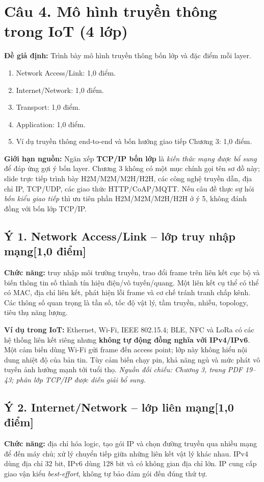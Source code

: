 \documentclass[12pt,a4paper]{article}
\newcommand{\muc}[1]{\subsection*{#1\hfill{\color{teal}\normalsize [1,0 điểm]}}}
\newcommand{\nguon}[1]{{\small\itshape\color{navy}Nguồn đối chiếu: #1.}}
\begin{document}
\section{Câu 4. Mô hình truyền thông trong IoT (4 lớp)}
\textbf{Đề giả định:} Trình bày mô hình truyền thông bốn lớp và đặc điểm mỗi layer.
\begin{barem}
\begin{enumerate}
\item Network Access/Link: 1,0 điểm.
\item Internet/Network: 1,0 điểm.
\item Transport: 1,0 điểm.
\item Application: 1,0 điểm.
\item Ví dụ truyền thông end-to-end và bốn hướng giao tiếp Chương 3: 1,0 điểm.
\end{enumerate}
\end{barem}
\begin{luuy}
\textbf{Giới hạn nguồn:} Ngăn xếp \textbf{TCP/IP bốn lớp} là \emph{kiến thức mạng được bổ sung} để đáp ứng gợi ý bốn layer. Chương 3 không có một mục chính gọi tên sơ đồ này; slide trực tiếp trình bày H2M/M2M/M2H/H2H, các công nghệ truyền dẫn, địa chỉ IP, TCP/UDP, các giao thức HTTP/CoAP/MQTT. Nếu câu đề thực sự hỏi \emph{bốn kiểu giao tiếp} thì ưu tiên phần H2M/M2M/M2H/H2H ở ý 5, không đánh đồng với bốn lớp TCP/IP.
\end{luuy}

\muc{Ý 1. Network Access/Link -- lớp truy nhập mạng}
\textbf{Chức năng:} truy nhập môi trường truyền, trao đổi frame trên liên kết cục bộ và biến thông tin số thành tín hiệu điện/vô tuyến/quang. Một liên kết cụ thể có thể có MAC, địa chỉ liên kết, phát hiện lỗi frame và cơ chế tránh tranh chấp kênh. Các thông số quan trọng là tần số, tốc độ vật lý, tầm truyền, nhiễu, topology, tiêu thụ năng lượng.

\textbf{Ví dụ trong IoT:} Ethernet, Wi-Fi, IEEE 802.15.4; BLE, NFC và LoRa có các hệ thống liên kết riêng nhưng \textbf{không tự động đồng nghĩa với IPv4/IPv6}. Một cảm biến dùng Wi-Fi gửi frame đến access point; lớp này không hiểu nội dung nhiệt độ của bản tin. Tùy cảm biến chạy pin, khả năng ngủ và mức phát vô tuyến ảnh hưởng mạnh tới tuổi thọ. \nguon{Chương 3, trang PDF 19--43; phân lớp TCP/IP được diễn giải bổ sung}

\muc{Ý 2. Internet/Network -- lớp liên mạng}
\textbf{Chức năng:} địa chỉ hóa logic, tạo gói IP và chọn đường truyền qua nhiều mạng để đến máy chủ; xử lý chuyển tiếp giữa những liên kết vật lý khác nhau. IPv4 dùng địa chỉ 32 bit, IPv6 dùng 128 bit và có không gian địa chỉ lớn. IP cung cấp giao vận kiểu \emph{best-effort}, không tự bảo đảm gói đến đúng thứ tự.
\end{document}
